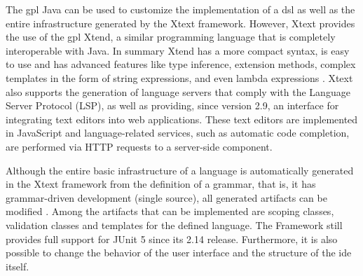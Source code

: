 
The \ac{gpl} Java can be used to customize the implementation of a \ac{dsl} as well as the entire infrastructure generated by the Xtext framework.
However, Xtext provides the use of the \ac{gpl} Xtend, a similar programming language that is completely interoperable with Java. 
In summary Xtend has a more compact syntax, is easy to use and has advanced features like type inference, extension methods, complex templates in the form of string expressions, and even lambda expressions \cite{Bettini:2016}.
Xtext also supports the generation of language servers that comply with the Language Server Protocol (LSP), as well as providing, since version 2.9, an interface for integrating text editors into web applications.
These text editors are implemented in JavaScript and language-related services, such as automatic code completion, are performed via HTTP requests to a server-side component.

Although the entire basic infrastructure of a language is automatically generated in the Xtext framework from the definition of a grammar, that is, it has grammar-driven development (single source), all generated artifacts can be modified \cite{XtextSirius:2017}.
Among the artifacts that can be implemented are scoping classes, validation classes and templates for the defined language.
The Framework still provides full support for JUnit 5 since its 2.14 release.
Furthermore, it is also possible to change the behavior of the user interface and the structure of the \ac{ide} itself.

